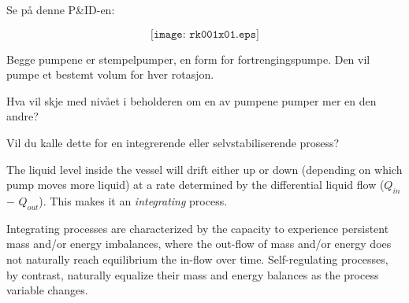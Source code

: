 


Se på denne P\&ID-en:

$$\texttt{[image: rk001x01.eps]}$$

Begge pumpene er stempelpumper, en form for fortrengingspumpe. Den vil pumpe et bestemt volum for hver rotasjon. 

Hva vil skje med nivået i beholderen om en av pumpene  pumper mer en den andre?
 
\vskip 10pt

Vil du kalle dette for en integrerende eller selvstabiliserende prosess?







The liquid level inside the vessel will drift either up or down (depending on which pump moves more liquid) at a rate determined by the differential liquid flow ($Q_{in}$ $-$ $Q_{out}$).  This makes it an {\it integrating} process.

\vskip 10pt

Integrating processes are characterized by the capacity to experience persistent mass and/or energy imbalances, where the out-flow of mass and/or energy does not naturally reach equilibrium the in-flow over time.  Self-regulating processes, by contrast, naturally equalize their mass and energy balances as the process variable changes.











